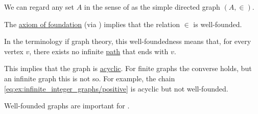 \begin{remark}\label{rem:well_founded_graphs}
  We can regard any set \( A \) in the sense of \hyperref[def:zfc]{} as the simple directed graph \( (A, \in) \).

  The \hyperref[def:zfc/foundation]{axiom of foundation} (via ) implies that the relation \( \in \) is well-founded.

  In the terminology if graph theory, this well-foundedness means that, for every vertex \( v \), there exists no infinite \hyperref[def:quiver_path]{path} that ends with \( v \).

  This implies that the graph is \hyperref[def:undirected_multigraph_path]{acyclic}. For finite graphs the converse holds, but an infinite graph this is not so. For example, the chain \eqref{eq:ex:infinite_integer_graphs/positive} is acyclic but not well-founded.

  Well-founded graphs are important for .
\end{remark}

